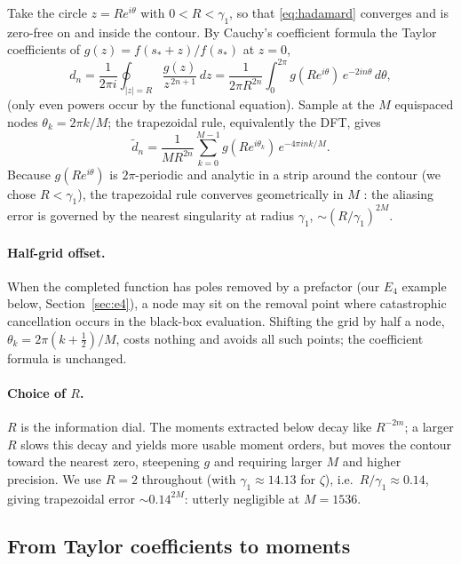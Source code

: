 \documentclass[11pt]{article}
\theoremstyle{definition}
\begin{document}
Take the circle $z=R e^{i\theta}$ with $0<R<\gamma_1$, so that
\eqref{eq:hadamard} converges and is zero-free on and inside the
contour. By Cauchy's coefficient formula the Taylor coefficients of
$g(z)=f(s_\ast+z)/f(s_\ast)$ at $z=0$,
\begin{equation}\label{eq:cauchy}
d_n=\frac{1}{2\pi i}\oint_{|z|=R}\frac{g(z)}{z^{\,2n+1}}\,dz
=\frac{1}{2\pi R^{2n}}\int_0^{2\pi} g(Re^{i\theta})\,
e^{-2in\theta}\,d\theta ,
\end{equation}
(only even powers occur by the functional equation). Sample at the
$M$ equispaced nodes $\theta_k=2\pi k/M$; the trapezoidal rule,
equivalently the DFT, gives
\begin{equation}\label{eq:dft}
\widetilde d_n=\frac{1}{M R^{2n}}\sum_{k=0}^{M-1}g(Re^{i\theta_k})\,
e^{-4\pi i n k/M}.
\end{equation}
Because $g(Re^{i\theta})$ is $2\pi$-periodic and analytic in a strip
around the contour (we chose $R<\gamma_1$), the trapezoidal rule
converves geometrically in $M$ \cite{Trefethen2014}: the aliasing
error is governed by the nearest singularity at radius $\gamma_1$,
$\sim(R/\gamma_1)^{2M}$.

\paragraph{Half-grid offset.}
When the completed function has poles removed by a prefactor (our
$E_4$ example below, Section~\ref{sec:e4}), a node may sit on the
removal point where catastrophic cancellation occurs in the
black-box evaluation. Shifting the grid by half a node,
$\theta_k=2\pi(k+\tfrac12)/M$, costs nothing and avoids all such
points; the coefficient formula is unchanged.

\paragraph{Choice of $R$.}
$R$ is the information dial. The moments extracted below decay like
$R^{-2m}$; a larger $R$ slows this decay and yields more usable
moment orders, but moves the contour toward the nearest zero,
steepening $g$ and requiring larger $M$ and higher precision. We use
$R=2$ throughout (with $\gamma_1\approx 14.13$ for $\zeta$), i.e.\
$R/\gamma_1\approx 0.14$, giving trapezoidal error
$\sim 0.14^{2M}$: utterly negligible at $M=1536$.

\subsection{From Taylor coefficients to moments}\label{sec:logmoments}
\end{document}

